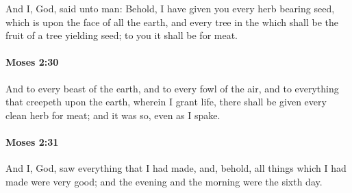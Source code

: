			And I, God, said unto man: Behold, I have given you every herb bearing seed, which is upon the face of all the earth, and every tree in the which shall be the fruit of a tree yielding seed; to you it shall be for meat.


		\paragraph{Moses 2:30} %
			\label{MOSES-2-30}

			And to every beast of the earth, and to every fowl of the air, and to everything that creepeth upon the earth, wherein I grant life, there shall be given every clean herb for meat; and it was so, even as I spake.


		\paragraph{Moses 2:31} %
			\label{MOSES-2-31}

			And I, God, saw everything that I had made, and, behold, all things which I had made were very good; and the evening and the morning were the sixth day.

		
